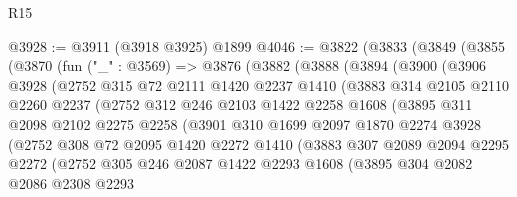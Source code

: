 \begin{lexlean}{R15}
\begin{coremodule}
@3928 := @3911 (@3918 @3925) @1899
@4046 := @3822
    (@3833
      (@3849
        (@3855
          (@3870
            (fun ("_" : @3569) =>
            @3876
              (@3882
                (@3888
                  (@3894
                    (@3900
                      (@3906
                        @3928
                        (@2752
                          @315
                          @72
                          @2111
                          @1420
                          @2237
                          @1410
                          (@3883
                            @314
                            @2105
                            @2110
                            @2260
                            @2237
                            (@2752
                              @312
                              @246
                              @2103
                              @1422
                              @2258
                              @1608
                              (@3895
                                @311
                                @2098
                                @2102
                                @2275
                                @2258
                                (@3901
                                  @310
                                  @1699
                                  @2097
                                  @1870
                                  @2274
                                  @3928
                                  (@2752
                                    @308
                                    @72
                                    @2095
                                    @1420
                                    @2272
                                    @1410
                                    (@3883
                                      @307
                                      @2089
                                      @2094
                                      @2295
                                      @2272
                                      (@2752
                                        @305
                                        @246
                                        @2087
                                        @1422
                                        @2293
                                        @1608
                                        (@3895
                                          @304
                                          @2082
                                          @2086
                                          @2308
                                          @2293

\end{coremodule}
\end{lexlean}
